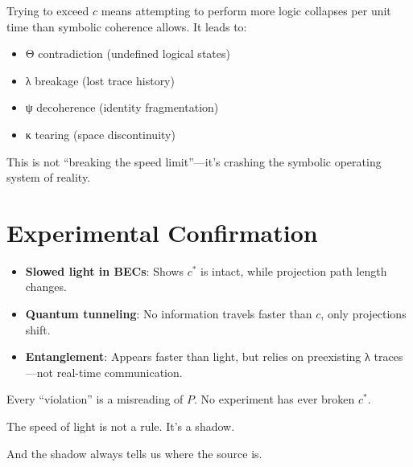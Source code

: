 Trying to exceed $c$ means attempting to perform more logic collapses per unit time than symbolic coherence allows. It leads to:

\begin{itemize}
\item Θ contradiction (undefined logical states)
\item λ breakage (lost trace history)
\item ψ decoherence (identity fragmentation)
\item κ tearing (space discontinuity)
\end{itemize}

This is not “breaking the speed limit”—it’s crashing the symbolic operating system of reality.

\section{Experimental Confirmation}

\begin{itemize}
\item \textbf{Slowed light in BECs}: Shows $c^*$ is intact, while projection path length changes.
\item \textbf{Quantum tunneling}: No information travels faster than $c$, only projections shift.
\item \textbf{Entanglement}: Appears faster than light, but relies on preexisting λ traces—not real-time communication.
\end{itemize}

Every “violation” is a misreading of $P$. No experiment has ever broken $c^*$.

\bigskip

The speed of light is not a rule. It’s a shadow.

And the shadow always tells us where the source is.
